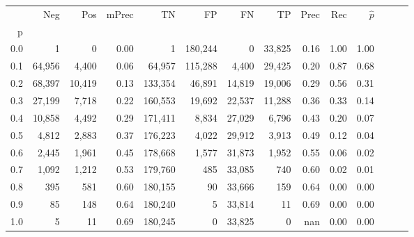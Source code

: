 \begin{tabular}{rrrrrrrrrrrrrr}
\toprule
{} &     Neg &     Pos & mPrec &       TN &       FP &      FN &      TP &  Prec &   Rec & $\hat{p}$ \\
p   &         &         &       &          &          &         &         &       &       &           \\
\midrule
0.0 &       1 &       0 &  0.00 &        1 &  180,244 &       0 &  33,825 &  0.16 &  1.00 &      1.00 \\
0.1 &  64,956 &   4,400 &  0.06 &   64,957 &  115,288 &   4,400 &  29,425 &  0.20 &  0.87 &      0.68 \\
0.2 &  68,397 &  10,419 &  0.13 &  133,354 &   46,891 &  14,819 &  19,006 &  0.29 &  0.56 &      0.31 \\
0.3 &  27,199 &   7,718 &  0.22 &  160,553 &   19,692 &  22,537 &  11,288 &  0.36 &  0.33 &      0.14 \\
0.4 &  10,858 &   4,492 &  0.29 &  171,411 &    8,834 &  27,029 &   6,796 &  0.43 &  0.20 &      0.07 \\
0.5 &   4,812 &   2,883 &  0.37 &  176,223 &    4,022 &  29,912 &   3,913 &  0.49 &  0.12 &      0.04 \\
0.6 &   2,445 &   1,961 &  0.45 &  178,668 &    1,577 &  31,873 &   1,952 &  0.55 &  0.06 &      0.02 \\
0.7 &   1,092 &   1,212 &  0.53 &  179,760 &      485 &  33,085 &     740 &  0.60 &  0.02 &      0.01 \\
0.8 &     395 &     581 &  0.60 &  180,155 &       90 &  33,666 &     159 &  0.64 &  0.00 &      0.00 \\
0.9 &      85 &     148 &  0.64 &  180,240 &        5 &  33,814 &      11 &  0.69 &  0.00 &      0.00 \\
1.0 &       5 &      11 &  0.69 &  180,245 &        0 &  33,825 &       0 &   nan &  0.00 &      0.00 \\
\bottomrule
\end{tabular}
